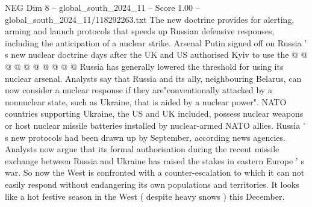 \begin{textsample}{NEG Dim 8 – global\_south\_2024\_11 – Score 1.00 – global\_south\_2024\_11/118292263.txt}
The new doctrine provides for alerting, arming and launch protocols that speeds up Russian defensive responses, including the anticipation of a nuclear strike.
Arsenal Putin signed off on Russia ' s new nuclear doctrine days after the UK and US authorised Kyiv to use the @ @ @ @ @ @ @ @ @ @ Russia has generally lowered the threshold for using its nuclear arsenal.
Analysts say that Russia and its ally, neighbouring Belarus, can now consider a nuclear response if they are"conventionally attacked by a nonnuclear state, such as Ukraine, that is aided by a nuclear power".
NATO countries supporting Ukraine, the US and UK included, possess nuclear weapons or host nuclear missile batteries installed by nuclear-armed NATO allies.
Russia ' s new protocols had been drawn up by September, according news agencies.
Analysts now argue that its formal authorisation during the recent missile exchange between Russia and Ukraine has raised the stakes in eastern Europe ' s war.
So now the West is confronted with a counter-escalation to which it can not easily respond without endangering its own populations and territories.
It looks like a hot festive season in the West ( despite heavy snows ) this December.

\end{textsample}
